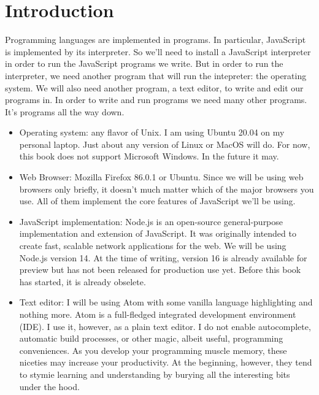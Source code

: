 \chapter{\label{chapter:intro} Introduction}

Programming languages are implemented in programs. In particular, JavaScript is implemented by its interpreter. So we'll need to install a JavaScript interpreter in order to run the JavaScript programs we write. But in order to run the interpreter, we need another program that will run the intepreter: the operating system. We will also need another program, a text editor, to write and edit our programs in. In order to write and run programs we need many other programs. It's programs all the way down.

\begin{itemize}
  \item Operating system: any flavor of Unix. I am using Ubuntu 20.04 on my personal laptop. Just about any version of Linux or MacOS will do. For now, this book does not support Microsoft Windows. In the future it may.
  \item Web Browser: Mozilla Firefox 86.0.1 or Ubuntu. Since we will be using web browsers only briefly, it doesn't much matter which of the major browsers you use. All of them implement the core features of JavaScript we'll be using.
  \item JavaScript implementation: Node.js is an open-source general-purpose implementation and extension of JavaScript. It was originally intended to create fast, scalable network applications for the web. We will be using Node.js version 14. At the time of writing, version 16 is already available for preview but has not been released for production use yet. Before this book has started, it is already obselete.
  \item Text editor: I will be using Atom with some vanilla language highlighting and nothing more. Atom is a full-fledged integrated development environment (IDE). I use it, however, as a plain text editor. I do not enable autocomplete, automatic build processes, or other magic, albeit useful, programming conveniences. As you develop your programming muscle memory, these niceties may increase your productivity. At the beginning, however, they tend to stymie learning and understanding by burying all the interesting bits under the hood.
\end{itemize}

